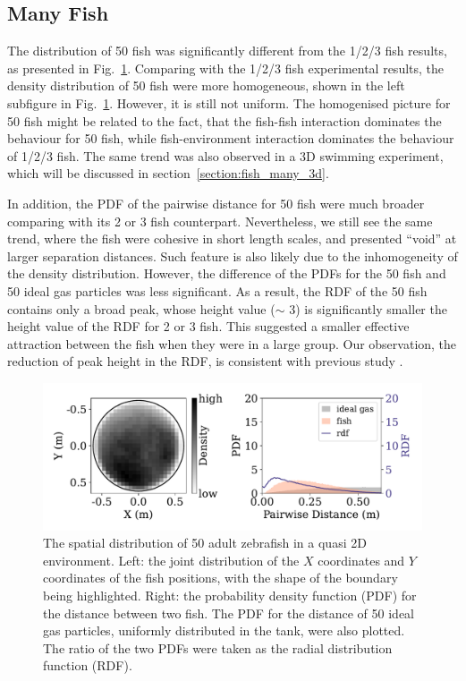\documentclass[11pt,twoside]{report}
\begin{document}
\subsection{Many Fish}
\label{section:fish_50_2d}

The distribution of 50 fish was significantly different from the 1/2/3 fish results, as presented in Fig.~\ref{fig:density_2d_fish_50}.
Comparing with the 1/2/3 fish experimental results, the density distribution of 50 fish were more homogeneous, shown in the left subfigure in Fig.~\ref{fig:density_2d_fish_50}. However, it is still not uniform. The homogenised picture for 50 fish might be related to the fact, that the fish-fish interaction dominates the behaviour for 50 fish, while fish-environment interaction dominates the behaviour of 1/2/3 fish. The same trend was also observed in a 3D swimming experiment, which will be discussed in section~\ref{section:fish_many_3d}.

In addition, the PDF of the pairwise distance for 50 fish were much broader comparing with its 2 or 3 fish counterpart. Nevertheless, we still see the same trend, where the fish were cohesive in short length scales, and presented ``void'' at larger separation distances. Such feature is also likely due to the inhomogeneity of the density distribution. However, the difference of the PDFs for the 50 fish and 50 ideal gas particles was less significant. As a result, the RDF of the 50 fish contains only a broad peak, whose height value ($\sim$ 3) is significantly smaller the height value of the RDF for 2 or 3 fish. This suggested a smaller effective attraction between the fish when they were in a large group. Our observation, the reduction of peak height in the RDF, is consistent with previous study \cite{romenskyy2017}.

\begin{figure}
  \includegraphics[width=\linewidth]{dist-50-fish}
  \caption[The 2D spatial distribution of 50 fish]{The spatial distribution of 50 adult zebrafish in a quasi 2D environment. Left: the joint distribution of the $X$ coordinates and $Y$ coordinates of the fish positions, with the shape of the boundary being highlighted. Right: the probability density function (PDF) for the distance between two fish. The PDF for the distance of 50 ideal gas particles, uniformly distributed in the tank, were also plotted. The ratio of the two PDFs were taken as the radial distribution function (RDF).}
  \label{fig:density_2d_fish_50}
\end{figure}
\end{document}
